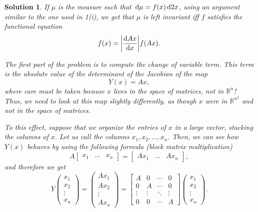 \documentclass{article}
\theoremstyle{nonumberplain}
\newtheorem{sol}{Solution}
\newcommand{\R}{\mathbb{R}}
\DeclarePairedDelimiter{\abs}{\lvert}{\rvert}
\begin{document}
\begin{sol}
If $\mu$ is the measure such that $\dl \mu = f(x) \dl2x$, using an argument similar to the one used in 1(i), we get that $\mu$ is left invariant iff $f$ satisfies the functional equation
\begin{equation}
f(x) = \abs*{\diff{Ax}{x}} f(Ax).
\end{equation}

The first part of the problem is to compute the change of variable term. This term is the absolute value of the determinant of the Jacobian of the map
\begin{equation}
Y(x) = Ax,
\end{equation}
where care must be taken because $x$ lives in the space of matrices, not in $\R^n$! Thus, we need to look at this map slightly differently, as though $x$ were in $\R^{n^2}$ and not in the space of matrices.

To this effect, suppose that we organize the entries of $x$ in a large vector, stacking the columns of $x$. Let us call the columns $x_1, x_2, \dots, x_n$. Then, we can see how $Y(x)$ behaves by using the following formula (block matrix multiplication)
\begin{equation}
A \begin{bmatrix} x_1 & \dots & x_n \end{bmatrix} = \begin{bmatrix} A x_1 & \dots & A x_n \end{bmatrix},
\end{equation}
and therefore we get
\begin{equation}
Y\begin{pmatrix} x_1 \\ x_2 \\ \vdots \\ x_n \end{pmatrix} = \begin{pmatrix} A x_1 \\ A x_2 \\ \vdots \\ A x_n \end{pmatrix} =
\begin{bmatrix}
A & 0 & \cdots & 0 \\
0 & A & \cdots & 0 \\
\vdots & \vdots & \ddots & \vdots \\
0 & 0 & \cdots & A
\end{bmatrix}
\begin{pmatrix} x_1 \\ x_2 \\ \vdots \\ x_n \end{pmatrix}.
\end{equation}


\end{sol}
\end{document}
